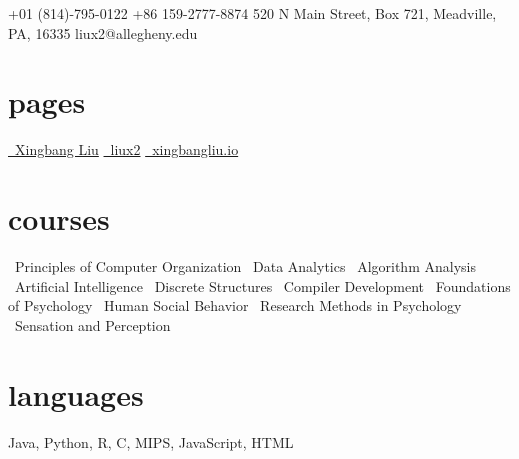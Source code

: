 \documentclass[]{friggeri-cv}
\begin{document}
       {
       \faMobilePhone\hspace{1mm} +01 (814)-795-0122 \hspace{0.1cm} 			   \faMobilePhone\hspace{1mm} +86 159-2777-8874 \hspace{0.1cm}
       520 N Main Street, Box 721, Meadville, PA, 16335 \hspace{0.1cm} 					\faEnvelope\hspace{1.5mm}liux2@allegheny.edu
       }

\begin{aside}
  \section{pages}\vspace{0.05cm}
    \href{https://www.linkedin.com/in/liux2}{\faLinkedin\ Xingbang Liu}\vspace{0.03cm}
    \href{https://github.com/liux2}{\faGithub\ liux2}\vspace{0.03cm}
    \href{https://xingbangliu.io/}{\faGlobe\ xingbangliu.io}\vspace{0.03cm}
  \section{courses}\vspace{0.05cm}
  \bullet\ Principles of Computer Organization\vspace{0.1cm}
  \bullet\ Data Analytics\vspace{0.1cm}
  \bullet\ Algorithm Analysis\vspace{0.1cm}
  \bullet\ Artificial Intelligence\vspace{0.1cm}
  \bullet\ Discrete Structures\vspace{0.1cm}
  \bullet\ Compiler Development\vspace{0.1cm}
  \bullet\ Foundations of Psychology\vspace{0.1cm}
  \bullet\ Human Social Behavior\vspace{0.1cm}
  \bullet\ Research Methods in Psychology\vspace{0.1cm}
  \bullet\ Sensation and Perception\vspace{0.1cm}
  \section{languages}\vspace{0.05cm}
    Java, Python, R, C, MIPS, JavaScript, HTML\vspace{0.1cm}

\end{aside}
\end{document}
